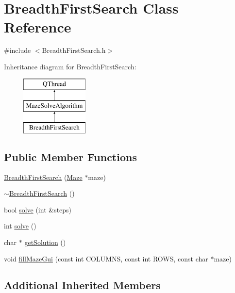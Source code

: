 \hypertarget{class_breadth_first_search}{\section{Breadth\-First\-Search Class Reference}
\label{class_breadth_first_search}
}


{\ttfamily \#include $<$Breadth\-First\-Search.\-h$>$}

Inheritance diagram for Breadth\-First\-Search\-:\begin{figure}[H]
\begin{center}
\leavevmode
\includegraphics[height=3.000000cm]{class_breadth_first_search}
\end{center}
\end{figure}
\subsection*{Public Member Functions}
\begin{DoxyCompactItemize}
\item 
\hyperlink{class_breadth_first_search_aa2eb988878d47abbb9a75de86dd3ccb6}{Breadth\-First\-Search} (\hyperlink{class_maze}{Maze} $\ast$maze)
\item 
\hyperlink{class_breadth_first_search_af56e60466779aa47b1b3c10a1a84d8ca}{$\sim$\-Breadth\-First\-Search} ()
\item 
bool \hyperlink{class_breadth_first_search_a0fccce0a839583c2e80eaacc1be8ed2e}{solve} (int \&steps)
\item 
int \hyperlink{class_breadth_first_search_acae5e757df77a28bfc108d74bcb6c705}{solve} ()
\item 
char $\ast$ \hyperlink{class_breadth_first_search_a6a4af61431378b09f0f8828b01f937d3}{get\-Solution} ()
\item 
void \hyperlink{class_breadth_first_search_aac2ba876aca7559206142fc431a57b8d}{fill\-Maze\-Gui} (const int C\-O\-L\-U\-M\-N\-S, const int R\-O\-W\-S, const char $\ast$maze)
\end{DoxyCompactItemize}
\subsection*{Additional Inherited Members}


